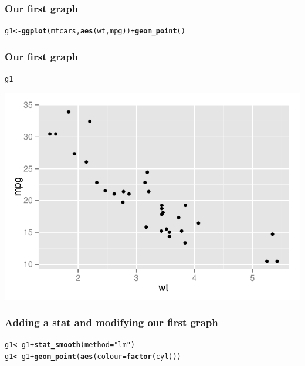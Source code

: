 \documentclass{beamer}\usepackage{graphicx, color}
\makeatletter
\def\maxwidth{ %
  \ifdim\Gin@nat@width>\linewidth
    \linewidth
  \else
    \Gin@nat@width
  \fi
}
\newcommand{\hlfunctioncall}[1]{\textcolor[rgb]{0.501960784313725,0,0.329411764705882}{\textbf{#1}}}%
\newcommand{\hlstring}[1]{\textcolor[rgb]{0.6,0.6,1}{#1}}%
\newenvironment{kframe}{%
 \def\at@end@of@kframe{}%
 \ifinner\ifhmode%
  \def\at@end@of@kframe{\end{minipage}}%
  \begin{minipage}{\columnwidth}%
 \fi\fi%
 \def\FrameCommand##1{\hskip\@totalleftmargin \hskip-\fboxsep
 \colorbox{shadecolor}{##1}\hskip-\fboxsep
     \hskip-\linewidth \hskip-\@totalleftmargin \hskip\columnwidth}%
 \MakeFramed {\advance\hsize-\width
   \@totalleftmargin\z@ \linewidth\hsize
   \@setminipage}}%
 {\par\unskip\endMakeFramed%
 \at@end@of@kframe}
\newenvironment{knitrout}{}{} %
\makeatother
\begin{document}
\begin{frame}[fragile]
  \frametitle{Our first graph}
\begin{knitrout}
\color{fgcolor}\begin{kframe}
\begin{alltt}
g1 <- \hlfunctioncall{ggplot}(mtcars, \hlfunctioncall{aes}(wt, mpg)) + \hlfunctioncall{geom_point}()
\end{alltt}
\end{kframe}
\end{knitrout}


\end{frame}

\begin{frame}[fragile]
  \frametitle{Our first graph}
\begin{knitrout}
\color{fgcolor}\begin{kframe}
\begin{alltt}
g1
\end{alltt}
\end{kframe}
\includegraphics[width=\maxwidth]{figure/first-print} 

\end{knitrout}


\end{frame}

\begin{frame}[fragile]
  \frametitle{Adding a stat and modifying our first graph}
\begin{knitrout}
\color{fgcolor}\begin{kframe}
\begin{alltt}
g1 <- g1 + \hlfunctioncall{stat_smooth}(method = \hlstring{"lm"})
g1 <- g1 + \hlfunctioncall{geom_point}(\hlfunctioncall{aes}(colour = \hlfunctioncall{factor}(cyl)))
\end{alltt}
\end{kframe}
\end{knitrout}


\end{frame}
\end{document}
